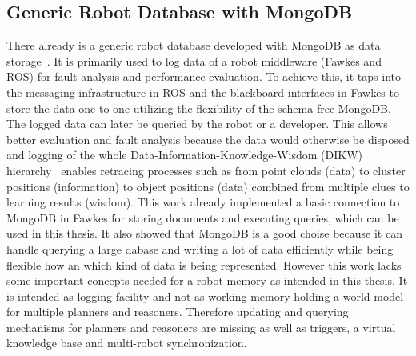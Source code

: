 \documentclass[a4paper,11pt]{article}
\begin{document}
\subsection{Generic Robot Database with MongoDB}
\label{sec:mongo-logging}
There already is a generic robot database developed with MongoDB as
data storage~\cite{RoboDB}. It is primarily used to log data of a
robot middleware (Fawkes and ROS) for fault analysis and performance
evaluation. To achieve this, it taps into the messaging infrastructure
in ROS and the blackboard interfaces in Fawkes to store the data one
to one utilizing the flexibility of the schema free MongoDB. The
logged data can later be queried by the robot or a developer. This
allows better evaluation and fault analysis because the data would
otherwise be disposed and logging of the whole
Data-Information-Knowledge-Wisdom (DIKW) hierarchy~\cite{DIKW} enables
retracing processes such as from point clouds (data) to cluster
positions (information) to object positions (data) combined from
multiple clues to learning results (wisdom). This work already
implemented a basic connection to MongoDB in Fawkes for storing
documents and executing queries, which can be used in this thesis. It
also showed that MongoDB is a good choise because it can handle
querying a large dabase and writing a lot of data efficiently while
being flexible how an which kind of data is being represented.
However this work lacks some important concepts needed for a robot
memory as intended in this thesis. It is intended as logging facility
and not as working memory holding a world model for multiple planners
and reasoners. Therefore updating and querying mechanisms for planners
and reasoners are missing as well as triggers, a virtual knowledge
base and multi-robot synchronization.
\end{document}
